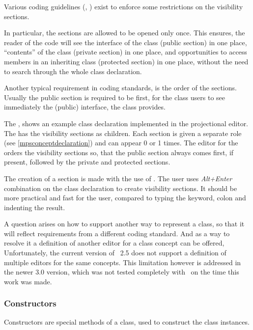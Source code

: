 Various coding guidelines (\cite{cppclasslayout}, \cite{googlecppstyle}) exist to enforce some 
restrictions on the visibility sections.

In particular, the sections are allowed to be opened only once. This ensures, the
reader of the code will see the interface of the class (public section) in one place,
``contents'' of the class (private section) in one place, and opportunities to access members in
an inheriting class (protected section) in one place, without the need to search through
the whole class declaration.

Another typical requirement in coding standards, is the order of the sections. Usually the public 
section is required to be first, for the class users to see immediately the (public) interface,
the class provides.



The , shows an example class declaration implemented in the projectional editor.
The   has the visibility sections as children. Each section is given a separate role 
(see \ref{mpsconceptdeclaration}) and can appear 0 or 1 times. The editor for the   
orders the visibility sections so, that the public section always comes first, if present, 
followed by the private and protected sections.

The creation of a section is made with the use of . The user
uses \emph{Alt+Enter} combination on the class declaration to create visibility sections.
It should be more practical and fast for the user, compared to typing the keyword, colon and
indenting the result.

A question arises on how to support another way to represent a class, so that it will reflect
requirements from a different coding standard. And as a way to resolve it a definition of 
another editor for a class concept can be offered, Unfortunately, the current version of \jbmps\ 2.5
does not support a definition of multiple editors for the same concepts. This limitation however
is addressed in the newer 3.0 version, which was not tested completely with \mbdr\ on the time
this work was made.


\subsubsection{Constructors}
\label{classconstructors}

Constructors are special methods of a class, used to construct the class instances. 

